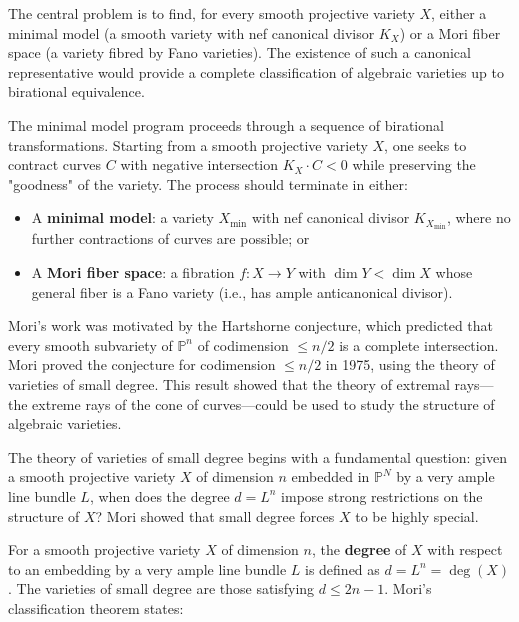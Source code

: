 The central problem is to find, for every smooth projective variety $X$, either
a minimal model (a smooth variety with nef canonical divisor $K_X$) or a Mori
fiber space (a variety fibred by Fano varieties). The existence of such a
canonical representative would provide a complete classification of algebraic
varieties up to birational equivalence.

The minimal model program proceeds through a sequence of birational transformations.
Starting from a smooth projective variety $X$, one seeks to contract curves $C$
with negative intersection $K_X \cdot C < 0$ while preserving the "goodness" of
the variety. The process should terminate in either:
\begin{itemize}
    \item A \textbf{minimal model}: a variety $X_{\min}$ with nef canonical divisor
    $K_{X_{\min}}$, where no further contractions of curves are possible; or
    \item A \textbf{Mori fiber space}: a fibration $f: X \to Y$ with $\dim Y < \dim X$
    whose general fiber is a Fano variety (i.e., has ample anticanonical divisor).
\end{itemize}

Mori's work was motivated by the Hartshorne conjecture, which predicted that
every smooth subvariety of $\mathbb{P}^n$ of codimension $\leq n/2$ is a complete
intersection. Mori proved the conjecture for codimension $\leq n/2$ in 1975,
using the theory of varieties of small degree. This result showed that the theory
of extremal rays---the extreme rays of the cone of curves---could be used to
study the structure of algebraic varieties.

The theory of varieties of small degree begins with a fundamental question:
given a smooth projective variety $X$ of dimension $n$ embedded in $\mathbb{P}^N$
by a very ample line bundle $L$, when does the degree $d = L^n$ impose strong
restrictions on the structure of $X$? Mori showed that small degree forces $X$
to be highly special.

For a smooth projective variety $X$ of dimension $n$, the \textbf{degree} of $X$
with respect to an embedding by a very ample line bundle $L$ is defined as
$d = L^n = \deg(X)$. The varieties of small degree are those satisfying
$d \leq 2n - 1$. Mori's classification theorem states:


